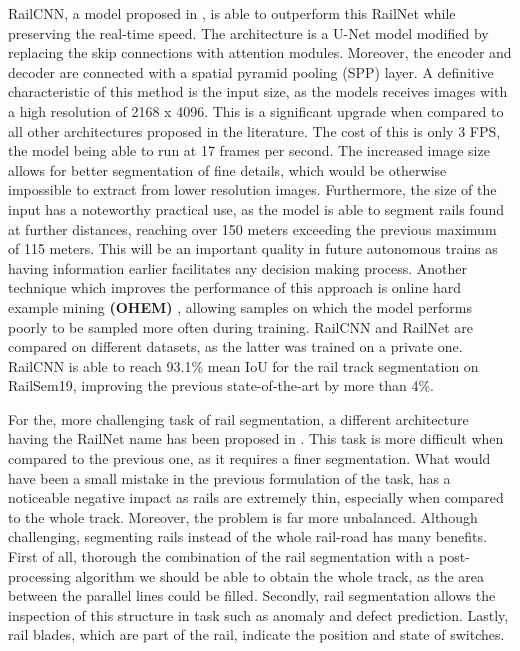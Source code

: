 \documentclass[conference]{IEEEtran}
\begin{document}
RailCNN, a model proposed in \cite{belyaev2020railroad}, is able to outperform this RailNet while preserving the real-time speed. The architecture is a U-Net model modified by replacing the skip connections with attention modules. Moreover, the encoder and decoder are connected with a spatial pyramid pooling (SPP) layer. A definitive characteristic of this method is the input size, as the models receives images with a high resolution of 2168 x 4096. This is a significant upgrade when compared to all other architectures proposed in the literature. The cost of this is only 3 FPS, the model being able to run at 17 frames per second. The increased image size allows for better segmentation of fine details, which would be otherwise impossible to extract from lower resolution images. Furthermore, the size of the input has a noteworthy practical use, as the model is able to segment rails found at further distances, reaching over 150 meters exceeding the previous maximum of  115 meters. This will be an important quality in future autonomous trains as having information earlier facilitates any decision making process. Another technique which improves the performance of this approach is online hard example mining \textbf{(OHEM)} \cite{shrivastava2016training}, allowing samples on which the model performs poorly to be sampled more often during training. RailCNN and RailNet are compared on different datasets, as the latter was trained on a private one. RailCNN is able to reach 93.1\% mean IoU for the rail track segmentation on RailSem19, improving the previous state-of-the-art by more than 4\%. 

For the, more challenging task of rail segmentation, a different architecture having the RailNet name has been proposed in \cite{li2020railnet}. This task is more difficult when compared to the previous one, as it requires a finer segmentation. What would have been a small mistake in the previous formulation of the task, has a noticeable negative impact as rails are extremely thin, especially when compared to the whole track. Moreover, the problem is far more unbalanced. Although challenging, segmenting rails instead of the whole rail-road has many benefits. First of all, thorough the combination of the rail segmentation with a post-processing algorithm we should be able to obtain the whole track, as the area between the parallel lines could be filled. Secondly, rail segmentation allows the inspection of this structure in task such as anomaly and defect prediction. Lastly, rail blades, which are part of the rail, indicate the position and state of switches.
\end{document}
